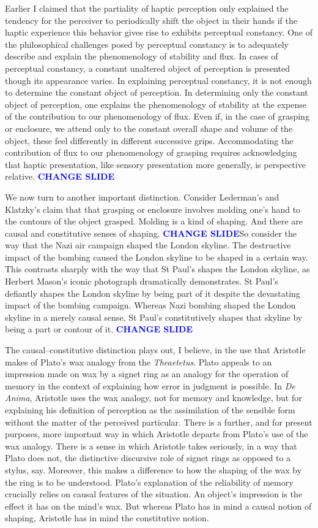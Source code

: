 \documentclass[12pt]{article}
\newcommand{\change}{\textcolor{blue}{\textbf{CHANGE SLIDE}}}
\begin{document}
Earlier I claimed that the partiality of haptic perception only explained the tendency for the perceiver to periodically shift the object in their hands if the haptic experience this behavior gives rise to exhibits perceptual constancy. One of the philosophical challenges posed by perceptual constancy is to adequately describe and explain the phenomenology of stability and flux. In cases of perceptual constancy, a constant unaltered object of perception is presented though its appearance varies. In explaining perceptual constancy, it is not enough to determine the constant object of perception. In determining only the constant object of perception, one explains the phenomenology of stability at the expense of the contribution to our phenomenology of flux. Even if, in the case of grasping or enclosure, we attend only to the constant overall shape and volume of the object, these feel differently in different successive grips. Accommodating the contribution of flux to our phenomenology of grasping requires acknowledging that haptic presentation, like sensory presentation more generally, is perspective relative. \change

We now turn to another important distinction. Consider Lederman's and Klatzky's claim that that grasping or enclosure involves molding one's hand to the contours of the object grasped. Molding is a kind of shaping. And there are causal and constitutive senses of shaping. \change So consider the way that the Nazi air campaign shaped the London skyline. The destructive impact of the bombing caused the London skyline to be shaped in a certain way. This contrasts sharply with the way that St Paul's shapes the London skyline, as Herbert Mason's iconic photograph dramatically demonstrates. St Paul's defiantly shapes the London skyline by being part of it despite the devastating impact of the bombing campaign. Whereas Nazi bombing shaped the London skyline in a merely causal sense, St Paul's constitutively shapes that skyline by being a part or contour of it. \change

The causal--constitutive distinction plays out, I believe, in the use that Aristotle makes of Plato's wax analogy from the \emph{Theaetetus}. Plato appeals to an impression made on wax by a signet ring as an analogy for the operation of memory in the context of explaining how error in judgment is possible. In \emph{De Anima}, Aristotle uses the wax analogy, not for memory and knowledge, but for explaining his definition of perception as the assimilation of the sensible form without the matter of the perceived particular. There is a further, and for present purposes, more important way in which Aristotle departs from Plato's use of the wax analogy. There is a sense in which Aristotle takes seriously, in a way that Plato does not, the distinctive discursive role of signet rings as opposed to a stylus, say. Moreover, this makes a difference to how the shaping of the wax by the ring is to be understood. Plato’s explanation of the reliability of memory crucially relies on causal features of the situation. An object’s impression is the effect it has on the mind’s wax. But whereas Plato has in mind a causal notion of shaping, Aristotle has in mind the constitutive notion. 
\end{document}
